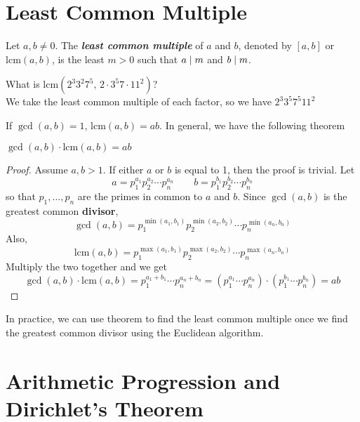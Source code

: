 

\newcommand\lcm{\mathrm{lcm}}



\section{Least Common Multiple}

\begin{definition}
    Let $a,b \neq 0$. The \textit{\textbf{least common multiple}} of $a$ and $b$, denoted by $[a,b]$ or $\lcm(a,b)$, is the least $m > 0$ such that $a \mathrel{\mid} m$ and $b \mathrel{\mid} m$.
\end{definition}

\begin{example}
    What is $\lcm(2^3 3^2 7^5,\, 2 \cdot 3^5 7 \cdot 11^2)$? \\
    We take the least common multiple of each factor, so we have $2^3 3^5 7^5 11^2$ 
\end{example}

If $\gcd(a,b) = 1$, $\lcm(a,b) = ab$. In general, we have the following theorem

\begin{theorem}
    $
    \gcd(a,b) \cdot \lcm(a,b) = ab
    $
\end{theorem}

\begin{proof}
    Assume $a,b > 1$. If either $a$ or $b$ is equal to 1, then the proof is trivial. Let
    $$
    a = p_1^{a_1} p_2^{a_2} \cdots p_n^{a_n} \qquad b = p_1^{b_1} p_2^{b_2} \cdots p_n^{b_n}
    $$
    so that $p_1,\ldots,p_n$ are the primes in common to $a$ and $b$. Since $\gcd(a,b)$ is the greatest common \textbf{divisor},
    $$
    \gcd(a,b) = p_1^{\min(a_1,b_1)} p_2^{\min(a_2,b_2)} \cdots p_n^{\min(a_n,b_n)}
    $$
    Also,
    $$
    \lcm(a,b) = p_1^{\max(a_1,b_1)} p_2^{\max(a_2,b_2)} \cdots p_n^{\max(a_n,b_n)}
    $$
    Multiply the two together and we get
    $$
    \gcd(a,b) \cdot \lcm(a,b) = p_1^{a_1+b_1} \cdots p_n^{a_n + b_n} = (p_1^{a_1} \cdots p_n^{a_n}) \cdot (p_1^{b_1} \cdots p_n^{b_n}) = ab
    $$
\end{proof}

In practice, we can use theorem to find the least common multiple once we find the greatest common divisor using the Euclidean algorithm.

\section{Arithmetic Progression and Dirichlet's Theorem}


